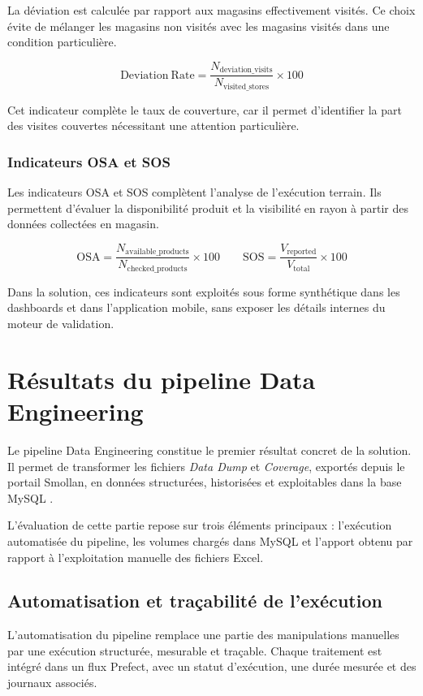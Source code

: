 La déviation est calculée par rapport aux magasins effectivement visités. Ce choix évite de mélanger les magasins non visités avec les magasins visités dans une condition particulière.

\[
\mathrm{Deviation\ Rate} =
\frac{N_{\mathrm{deviation\_visits}}}
{N_{\mathrm{visited\_stores}}}
\times 100
\]

Cet indicateur complète le taux de couverture, car il permet d’identifier la part des visites couvertes nécessitant une attention particulière.

\subsubsection{Indicateurs OSA et SOS}

Les indicateurs OSA et SOS complètent l’analyse de l’exécution terrain. Ils permettent d’évaluer la disponibilité produit et la visibilité en rayon à partir des données collectées en magasin.

\[
\mathrm{OSA} =
\frac{N_{\mathrm{available\_products}}}
{N_{\mathrm{checked\_products}}}
\times 100
\qquad
\mathrm{SOS} =
\frac{V_{\mathrm{reported}}}
{V_{\mathrm{total}}}
\times 100
\]

Dans la solution, ces indicateurs sont exploités sous forme synthétique dans les dashboards et dans l’application mobile, sans exposer les détails internes du moteur de validation.

\section{Résultats du pipeline Data Engineering}

Le pipeline Data Engineering constitue le premier résultat concret de la solution. Il permet de transformer les fichiers \textit{Data Dump} et \textit{Coverage}, exportés depuis le portail Smollan, en données structurées, historisées et exploitables dans la base MySQL .

L’évaluation de cette partie repose sur trois éléments principaux : l’exécution automatisée du pipeline, les volumes chargés dans MySQL et l’apport obtenu par rapport à l’exploitation manuelle des fichiers Excel.

\subsection{Automatisation et traçabilité de l’exécution}

L’automatisation du pipeline remplace une partie des manipulations manuelles par une exécution structurée, mesurable et traçable. Chaque traitement est intégré dans un flux Prefect, avec un statut d’exécution, une durée mesurée et des journaux associés.

